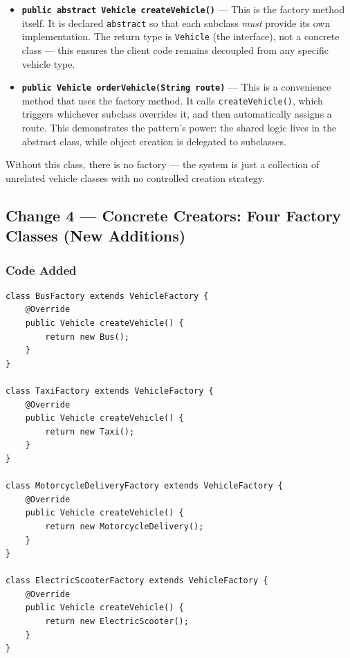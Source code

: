 \documentclass[12pt, a4paper]{article}
\begin{document}
\begin{itemize}[leftmargin=*, label=\textcolor{primaryblue}{\textbullet}]
    \item \textbf{\texttt{public abstract Vehicle createVehicle()}} --- This is the factory method itself. It is declared \texttt{abstract} so that each subclass \textit{must} provide its own implementation. The return type is \texttt{Vehicle} (the interface), not a concrete class --- this ensures the client code remains decoupled from any specific vehicle type.

    \item \textbf{\texttt{public Vehicle orderVehicle(String route)}} --- This is a convenience method that uses the factory method. It calls \texttt{createVehicle()}, which triggers whichever subclass overrides it, and then automatically assigns a route. This demonstrates the pattern's power: the shared logic lives in the abstract class, while object creation is delegated to subclasses.
\end{itemize}

Without this class, there is no factory --- the system is just a collection of unrelated vehicle classes with no controlled creation strategy.

\subsection{Change 4 --- Concrete Creators: Four Factory Classes (New Additions)}

\subsubsection{Code Added}

\begin{lstlisting}[caption={Four concrete factory classes}]
class BusFactory extends VehicleFactory {
    @Override
    public Vehicle createVehicle() {
        return new Bus();
    }
}

class TaxiFactory extends VehicleFactory {
    @Override
    public Vehicle createVehicle() {
        return new Taxi();
    }
}

class MotorcycleDeliveryFactory extends VehicleFactory {
    @Override
    public Vehicle createVehicle() {
        return new MotorcycleDelivery();
    }
}

class ElectricScooterFactory extends VehicleFactory {
    @Override
    public Vehicle createVehicle() {
        return new ElectricScooter();
    }
}
\end{lstlisting}
\end{document}
